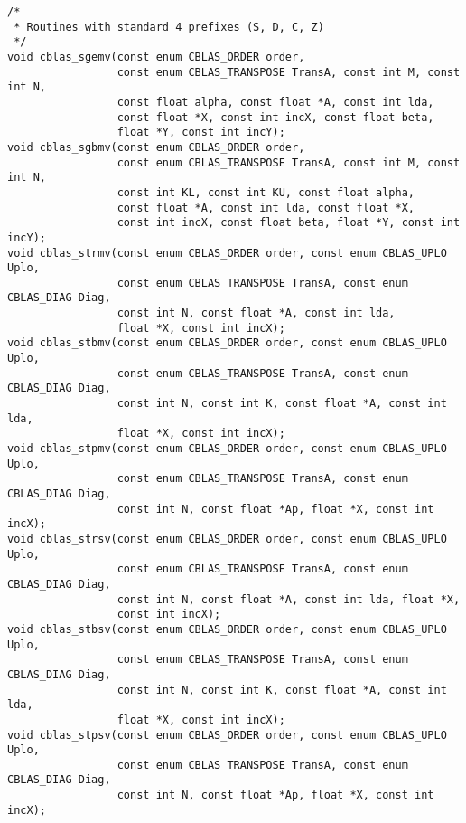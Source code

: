 \documentclass{article}
\begin{document}
\begin{Verbatim}[fontsize=\small,fontfamily=tt,fontshape=rm]
/* 
 * Routines with standard 4 prefixes (S, D, C, Z)
 */
void cblas_sgemv(const enum CBLAS_ORDER order,
                 const enum CBLAS_TRANSPOSE TransA, const int M, const int N,
                 const float alpha, const float *A, const int lda,
                 const float *X, const int incX, const float beta,
                 float *Y, const int incY);
void cblas_sgbmv(const enum CBLAS_ORDER order,
                 const enum CBLAS_TRANSPOSE TransA, const int M, const int N,
                 const int KL, const int KU, const float alpha,
                 const float *A, const int lda, const float *X,
                 const int incX, const float beta, float *Y, const int incY);
void cblas_strmv(const enum CBLAS_ORDER order, const enum CBLAS_UPLO Uplo,
                 const enum CBLAS_TRANSPOSE TransA, const enum CBLAS_DIAG Diag,
                 const int N, const float *A, const int lda, 
                 float *X, const int incX);
void cblas_stbmv(const enum CBLAS_ORDER order, const enum CBLAS_UPLO Uplo,
                 const enum CBLAS_TRANSPOSE TransA, const enum CBLAS_DIAG Diag,
                 const int N, const int K, const float *A, const int lda, 
                 float *X, const int incX);
void cblas_stpmv(const enum CBLAS_ORDER order, const enum CBLAS_UPLO Uplo,
                 const enum CBLAS_TRANSPOSE TransA, const enum CBLAS_DIAG Diag,
                 const int N, const float *Ap, float *X, const int incX);
void cblas_strsv(const enum CBLAS_ORDER order, const enum CBLAS_UPLO Uplo,
                 const enum CBLAS_TRANSPOSE TransA, const enum CBLAS_DIAG Diag,
                 const int N, const float *A, const int lda, float *X,
                 const int incX);
void cblas_stbsv(const enum CBLAS_ORDER order, const enum CBLAS_UPLO Uplo,
                 const enum CBLAS_TRANSPOSE TransA, const enum CBLAS_DIAG Diag,
                 const int N, const int K, const float *A, const int lda,
                 float *X, const int incX);
void cblas_stpsv(const enum CBLAS_ORDER order, const enum CBLAS_UPLO Uplo,
                 const enum CBLAS_TRANSPOSE TransA, const enum CBLAS_DIAG Diag,
                 const int N, const float *Ap, float *X, const int incX);


\end{Verbatim}
\end{document}

